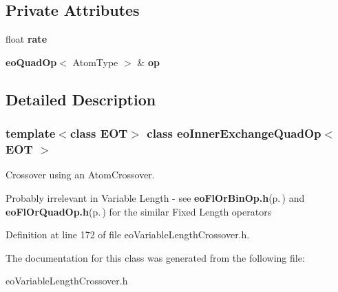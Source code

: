 \subsection*{Private Attributes}
\begin{CompactItemize}
\item 
float {\bf rate}\label{classeo_inner_exchange_quad_op_r0}

\item 
{\bf eo\-Quad\-Op}$<$ Atom\-Type $>$ \& {\bf op}\label{classeo_inner_exchange_quad_op_r1}

\end{CompactItemize}


\subsection{Detailed Description}
\subsubsection*{template$<$class EOT$>$ class eo\-Inner\-Exchange\-Quad\-Op$<$ EOT $>$}

Crossover using an Atom\-Crossover. 

Probably irrelevant in Variable Length - see {\bf eo\-Fl\-Or\-Bin\-Op.h}{\rm (p.\,\pageref{eo_fl_or_bin_op_8h})} and {\bf eo\-Fl\-Or\-Quad\-Op.h}{\rm (p.\,\pageref{eo_fl_or_quad_op_8h})} for the similar Fixed Length operators 



Definition at line 172 of file eo\-Variable\-Length\-Crossover.h.

The documentation for this class was generated from the following file:\begin{CompactItemize}
\item 
eo\-Variable\-Length\-Crossover.h\end{CompactItemize}
